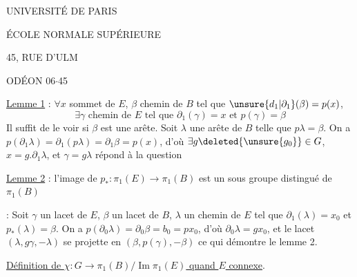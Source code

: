 \begin{center}
UNIVERSITÉ DE PARIS


ÉCOLE NORMALE SUPÉRIEURE


45, RUE D'ULM

ODÉON 06$\cdot$45

\end{center}


\uline{Lemme 1} : $\forall x$ sommet de $E$, $\beta$ chemin de $B$ tel que $\unsure{d_1|\partial_1}(\beta)=p(x)$,
\[
\exists\gamma\text{ chemin de }E\text{ tel que }\partial_1(\gamma)=x\text{ et }p(\gamma)=\beta
\]
 Il suffit de le voir si $\beta$ est une arête. Soit $\lambda$ une arête de $B$ telle que $p\lambda=\beta$. On a \deleted{$\unsure{\partial}$} $p(\partial_1\lambda)=\partial_1(p\lambda)=\partial_1\beta=p(x)$, d'où $\exists g\deleted{\unsure{g_0}}\in G$, $x=g.\partial_1\lambda$, et $\gamma=g\lambda$ répond à la question

\uline{Lemme 2} : l'image de $p_*:\pi_1(E)\to\pi_1(B)$ est un sous groupe distingué de $\pi_1(B)$

 : Soit $\gamma$ un lacet de  $E$, $\beta$ un lacet de $B$, $\lambda$ un chemin de $E$ tel que $\partial_1(\lambda)=x_0$ et $p_*(\lambda)=\beta$. On a $p(\partial_0\lambda)=\partial_0\beta=b_0=px_0$, d'où $\partial_0\lambda=gx_0$, et le lacet $(\lambda,g\gamma,-\lambda)$ se projette en $(\beta,p(\gamma),-\beta)$ ce qui démontre le lemme 2.

\uline{Définition de $\chi:G\to\pi_1(B)/\operatorname{Im}\pi_1(E)$ quand $E$ connexe}.

